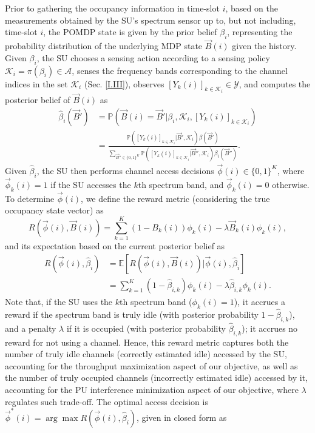 \documentclass[10pt, twocolumn]{IEEEtran}
\begin{document}
Prior to gathering the occupancy information in time-slot $i$, based on the measurements obtained by the SU's spectrum sensor up to, but not including, time-slot $i$, the POMDP state is given by the prior belief $\beta_{i}$, representing the probability distribution of the underlying MDP state $\vec{B}(i)$ given the history. Given $\beta_{i}$, the SU chooses a sensing action according to a sensing policy $\mathcal{K}_{i}=\pi(\beta_{i}){\in}\mathcal{A}$, 
senses the frequency bands corresponding to the channel indices in the set $\mathcal{K}_{i}$ (Sec. \ref{I.III}), observes $[Y_{k}(i)]_{k{\in}\mathcal{K}_{i}}{\in}\mathcal{Y}$, and computes the posterior belief of $\vec{B}(i)$ as
\begin{equation}\label{10}
    \begin{aligned}
        \hat{\beta}_{i}(\vec{B}')&=\mathbb{P}(\vec{B}(i)=\vec{B}'|\beta_{i},\mathcal{K}_{i},[Y_{k}(i)]_{k{\in}\mathcal{K}_{i}})\\
        &=\frac{\mathbb{P}([Y_{k}(i)]_{k{\in}\mathcal{K}_{i}}|\vec{B}',\mathcal{K}_{i})\beta(\vec{B}')}{\sum_{\vec{B}'' \in \{0,1\}^{K}}\mathbb{P}([Y_{k}(i)]_{k{\in}\mathcal{K}_{i}}|\vec{B}'',\mathcal{K}_{i})\beta_{i}(\vec{B}'')}.
    \end{aligned}
\end{equation}
Given  $ \hat{\beta}_{i}$, the SU then performs channel access decisions
$\vec{\phi}(i)\in\{0,1\}^K$, where
$\vec{\phi}_k(i)=1$ if the SU accesses the $k$th spectrum band, and $\vec{\phi}_k(i)=0$ otherwise. To determine $\vec{\phi}(i)$, we define the reward metric (considering the true occupancy state vector) as
\begin{equation}\label{12a}
    R(\vec{\phi}(i),\vec{B}(i))=\sum_{k=1}^{K}(1-B_{k}(i))\phi_{k}(i)-\lambda \vec{B}_{k}(i)\phi_k(i),
\end{equation}
and its expectation based on the current posterior belief as
\begin{equation}\label{12}
    \begin{aligned}
        R(\vec{\phi}(i),\hat{\beta}_{i})&=\mathbb{E}[R(\vec{\phi}(i),\vec{B}(i))|\vec{\phi}(i),\hat{\beta}_{i}]\\&=\sum_{k=1}^{K}(1-\hat{\beta}_{i,k})\phi_{k}(i)-\lambda \hat{\beta}_{i,k}\phi_k(i).
    \end{aligned}
\end{equation}
Note that, if the SU uses the $k$th spectrum band ($\phi_{k}(i)=1$), it accrues a reward if the
spectrum band is truly idle (with posterior probability $1-\hat{\beta}_{i,k}$), and a penalty $\lambda$ if it is occupied (with posterior probability $\hat{\beta}_{i,k}$); it accrues no reward for not using a channel. Hence, this reward metric captures both the number of truly idle channels (correctly estimated idle) accessed by the SU, accounting for the throughput maximization aspect of our objective, as well as the number of truly occupied channels (incorrectly estimated idle) accessed by it, accounting for the PU interference minimization aspect of our objective, where $\lambda$ regulates such trade-off. The optimal access decision is $\vec{\phi}^{*}(i){=}\arg\max R(\vec{\phi}(i),\hat{\beta}_{i})$, given in closed form as
\end{document}
